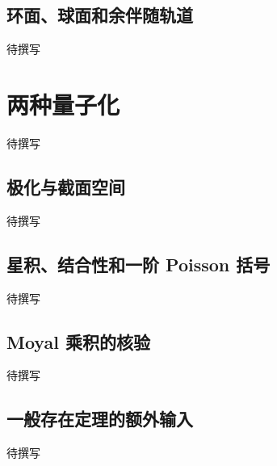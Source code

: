 \subsection{环面、球面和余伴随轨道}
\label{g4:subsec:C02:03}
待撰写

\section{两种量子化}
\label{g4:sec:C03}
待撰写

\subsection{极化与截面空间}
\label{g4:subsec:C03:01}
待撰写

\subsection{星积、结合性和一阶 Poisson 括号}
\label{g4:subsec:C03:02}
待撰写

\subsection{Moyal 乘积的核验}
\label{g4:subsec:C03:03}
待撰写

\subsection{一般存在定理的额外输入}
\label{g4:subsec:C03:04}
待撰写
